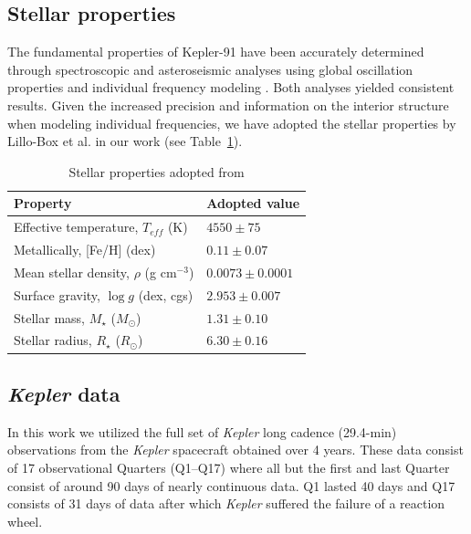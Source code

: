 \documentclass[apjl]{emulateapj}
\begin{document}
\subsection{Stellar properties}


The fundamental properties of Kepler-91 have been accurately determined through spectroscopic and asteroseismic analyses using global oscillation properties \citep{huber13} and individual frequency modeling \citep{lillo14} . Both analyses yielded consistent results. Given the increased precision and information on the interior structure when modeling individual frequencies, we have adopted the stellar properties by Lillo-Box et al. in our work (see Table~\ref{tab:stellar}).

\begin{table}
\centering
\caption{Stellar properties adopted from \citet{lillo14}}\label{tab:stellar}
\begin{tabular}{ll}
Property & Adopted value \\
\hline
Effective temperature, $T_{eff}$ (K)		&	$4550\pm75$ \\
Metallically, [Fe/H] (dex)				& 	$0.11 \pm0.07$\\
Mean stellar density, $\rho$ (g cm$^{-3}$)		&	$0.0073 \pm0.0001$ \\
Surface gravity, $\log{g}$ (dex, cgs)		&	$2.953 \pm 0.007$ \\
Stellar mass, $M_\star$ ($M_\odot$)		&	$1.31 \pm 0.10$\\
Stellar radius, $R_\star$ ($R_\odot$)		&	$6.30 \pm 0.16$ \\
\hline
\end{tabular}
\end{table}


\subsection{\emph{Kepler} data}
In this work we utilized the full set of \emph{Kepler} long cadence (29.4-min) observations from the \emph{Kepler} spacecraft obtained over 4 years. These data consist of 17 observational Quarters  (Q1--Q17) where all but the first and last Quarter consist of around 90 days of nearly continuous data. Q1 lasted 40 days and Q17 consists of 31 days of data after which \emph{Kepler} suffered the failure of a reaction wheel.
\end{document}
